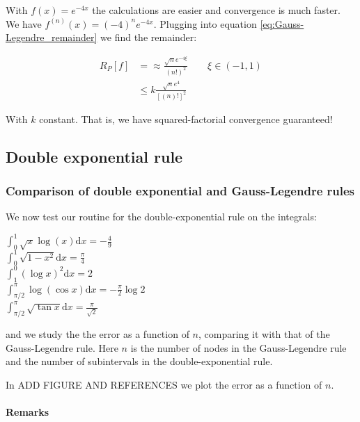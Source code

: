 \documentclass[a4paper,11]{article}
\newcounter{rowcount}
\begin{document}
With $f(x) = e^{-4x}$ the calculations are easier and convergence
is much faster. We have $f^{(n)}(x) = (-4)^{n}e^{-4x}$. Plugging into
equation \ref{eq:Gauss-Legendre_remainder} we find the remainder:

\[
\begin{aligned}
    R_P[f]&=\approx\frac{\sqrt{n}e^{-4\xi}}{(n!)^{2}}
    \qquad{}
    \xi\in(-1,1) \\
    &\leq k \frac{\sqrt{n}e^{4}}{[(n)!]^{2}}
\end{aligned}
\]

With $k$ constant.
That is, we have squared-factorial convergence guaranteed!



\subsection{Double exponential rule}

\subsubsection{Comparison of double exponential and Gauss-Legendre rules}

We now test our routine for the double-exponential rule on the integrals:

\setcounter{rowcount}{0}
\begin{mylist}
	$\int^{1}_{0} \sqrt{x}\log(x) \mathrm d x = -\frac{4}{9}$\\
	$\int_{0}^{1} \sqrt{1-x^{2}} \mathrm d x = \frac{\pi}{4}$\\
	$\int^{0}_{1} (\log x)^{2}\mathrm d x = 2$\\
	$\int^{\pi}_{\pi/2} \log(\cos x) \mathrm d x = -\frac{\pi}{2}\log 2$ \\
	$\int^{\pi}_{\pi/2} \sqrt{\tan x} \mathrm d x = \frac{\pi}{\sqrt{2}}$ \\
\end{mylist}

and we study the the error as a function of $n$, comparing it
with that of the Gauss-Legendre rule. Here $n$ is the number of nodes in the 
Gauss-Legendre rule and the number of 
subintervals in the double-exponential rule.


In ADD FIGURE AND REFERENCES we plot the error as a function of $n$.


\paragraph{Remarks}
\end{document}
